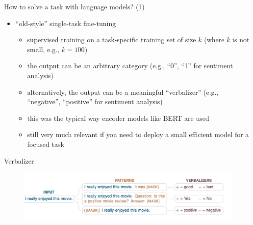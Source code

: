 \begin{frame}{How to solve a task with language models? (1)}

\vfill

\begin{itemize}
    \item ``old-style'' single-task fine-tuning 
        \begin{itemize}
            \item supervised training on a task-specific
        training set of size $k$ (where $k$ is not small,
        e.g., $k=100$)
        \item the output can be an arbitrary category (e.g.,
        ``0'', ``1'' for sentiment analysis)
            \item alternatively, the output can be a
        meaningful ``verbalizer'' (e.g., ``negative'',
        ``positive'' for sentiment analysis)
        \item this was the typical way encoder models like
        BERT are used
        \item still very much relevant if you need to deploy
        a small efficient model for a focused task
        \end{itemize}
\end{itemize}

\vfill

\end{frame}




\begin{frame}{Verbalizer}

\vfill
	
	\begin{figure}
		\centering
		\includegraphics[width = 12cm]{figure/schickverbalizer} 
	\end{figure}

\vfill

\end{frame}









